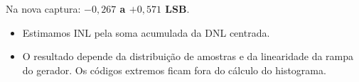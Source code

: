 \centering
{}
\par\small Na nova captura: \textbf{$-0{,}267$ a $+0{,}571$ LSB}.
\begin{itemize}
\item Estimamos INL pela soma acumulada da DNL centrada.
\item O resultado depende da distribuição de amostras e da linearidade da rampa do gerador. Os códigos extremos ficam fora do cálculo do histograma.
\end{itemize}
